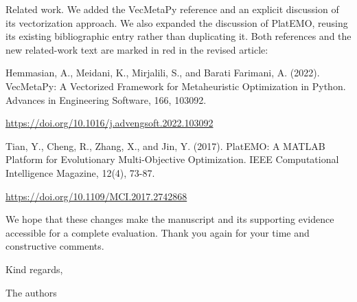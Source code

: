 \documentclass[11pt,letterpaper]{article}
\newcommand{\response}[1]{{\color{response}#1}\par}
\begin{document}
\response{Related work. We added the VecMetaPy reference and an explicit discussion of its vectorization approach. We also expanded the discussion of PlatEMO, reusing its existing bibliographic entry rather than duplicating it. Both references and the new related-work text are marked in red in the revised article:}

\response{Hemmasian, A., Meidani, K., Mirjalili, S., and Barati Farimani, A. (2022). VecMetaPy: A Vectorized Framework for Metaheuristic Optimization in Python. Advances in Engineering Software, 166, 103092.}

\response{\url{https://doi.org/10.1016/j.advengsoft.2022.103092}}
\response{Tian, Y., Cheng, R., Zhang, X., and Jin, Y. (2017). PlatEMO: A MATLAB Platform for Evolutionary Multi-Objective Optimization. IEEE Computational Intelligence Magazine, 12(4), 73-87.}

\response{\url{https://doi.org/10.1109/MCI.2017.2742868}}
\response{We hope that these changes make the manuscript and its supporting evidence accessible for a complete evaluation. Thank you again for your time and constructive comments.}

Kind regards,\par

The authors\par
\end{document}
